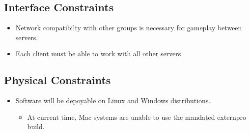 \documentclass[11pt, titlepage]{article}
\begin{document}
		\subsection{Interface Constraints}
			\begin{itemize}
				\item Network compatibilty with other groups is necessary for gameplay between servers.
				\item Each client must be able to work with all other servers.
			\end{itemize}
		\subsection{Physical Constraints}
			\begin{itemize}
				\item Software will be depoyable on Linux and Windows distributions.
				\begin{itemize}
					\item At current time, Mac systems are unable to use the mandated externpro build.
				\end{itemize}
			\end{itemize}
			
		
\end{document}
